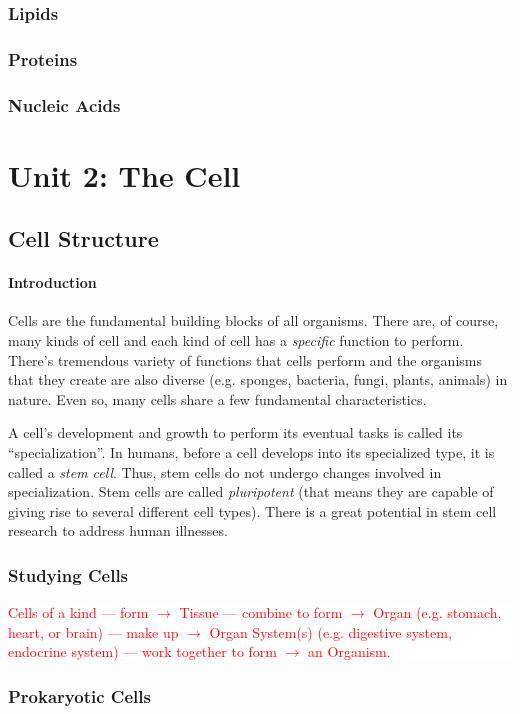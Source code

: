 \documentclass[12pt]{article}
\newcommand{\ctext}[3]{
    \colorbox{#2}{\parbox{0.9\textwidth}{\textcolor{#1}{#3}}}
}
\begin{document}
\subsubsection{Lipids}
\subsubsection{Proteins}
\subsubsection{Nucleic Acids}

\section{Unit 2: The Cell}
\subsection{Cell Structure}
\paragraph{Introduction}
Cells are the fundamental building blocks of all organisms. There are, of course, many kinds of cell and each kind of cell has a \emph{specific} function to perform. There's tremendous variety of functions that cells perform and the organisms that they create are also diverse (e.g. sponges, bacteria, fungi, plants, animals) in nature. Even so, many cells share a few fundamental characteristics.

A cell's development and growth to perform its eventual tasks is called its ``specialization''. In humans, before a cell develops into its specialized type, it is called a \emph{stem cell}. Thus, stem cells do not undergo changes involved in specialization. Stem cells are called \emph{pluripotent} (that means they are capable of giving rise to several different cell types). There is a great potential in stem cell research to address human illnesses.
\subsubsection{Studying Cells}
\ctext{red}{white}{
    Cells of a kind --- form $\rightarrow$ Tissue --- combine to form $\rightarrow$ Organ (e.g. stomach, heart, or brain) --- make up $\rightarrow$ Organ System(s) (e.g. digestive system, endocrine system) --- work together to form $\rightarrow$ an Organism.
}
\subsubsection{Prokaryotic Cells}
\end{document}
